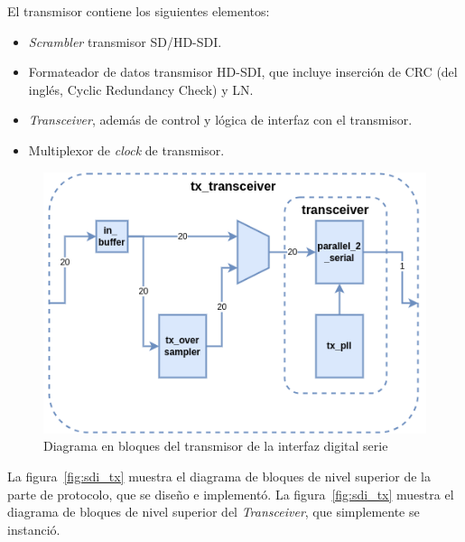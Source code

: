  El transmisor contiene los siguientes elementos:

  \begin{itemize}
      \item \textit{Scrambler} transmisor SD/HD-SDI\@.
      \item Formateador de datos transmisor HD-SDI, que incluye inserción de CRC  (del inglés, Cyclic Redundancy Check) y LN\@.
      \item \textit{Transceiver}, además de control y lógica de interfaz con el transmisor.
      \item Multiplexor de \textit{clock} de transmisor.
  \end{itemize}

  \vspace{1cm}
  \begin{figure}[htbp]
      \centering
      \includegraphics[width=\linewidth]{./Figures/tx_xcvr.png}
      \caption{Diagrama en bloques del transmisor de la interfaz digital serie}\label{fig:tx_xcvr}
  \end{figure}
  \vspace{1cm}

  La figura~\ref{fig:sdi_tx} muestra el diagrama de bloques de nivel superior de
  la parte de protocolo, que se diseño e implementó. La figura~\ref{fig:sdi_tx}
  muestra el diagrama de bloques de nivel superior del \textit{Transceiver}, que
  simplemente se instanció.

